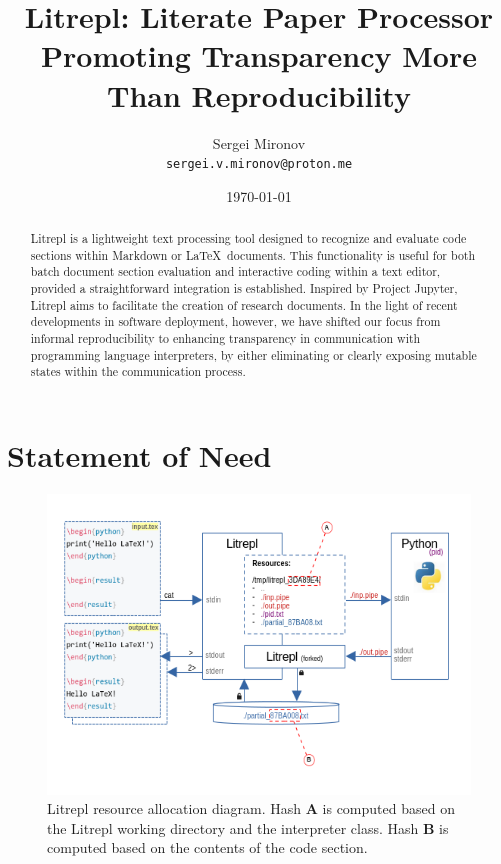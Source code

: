 \documentclass[letterpaper,12pt,twocolumn]{article}
\title{Litrepl: Literate Paper Processor Promoting Transparency More Than Reproducibility}
\author{Sergei Mironov \\
        \texttt{sergei.v.mironov@proton.me}}
\date{\today}
\newcommand{\Latex}{\LaTeX\ }
\begin{document}
\maketitle

\begin{abstract}

Litrepl is a lightweight text processing tool designed to recognize and evaluate
code sections within Markdown or \Latex documents. This functionality is useful
for both batch document section evaluation and interactive coding within a text
editor, provided a straightforward integration is established. Inspired by
Project Jupyter, Litrepl aims to facilitate the creation of research documents.
In the light of recent developments in software deployment, however, we have
shifted our focus from informal reproducibility to enhancing transparency in
communication with programming language interpreters, by either eliminating or
clearly exposing mutable states within the communication process.

\end{abstract}

\section{Statement of Need}

\begin{figure}[!hbt]
  \centering
  \includegraphics{pic}
  \caption{Litrepl resource allocation diagram. Hash \textbf{A} is computed
  based on the Litrepl working directory and the interpreter class. Hash
  \textbf{B} is computed based on the contents of the code section.}
  \label{fig:resource-allocation}
\end{figure}
\end{document}
